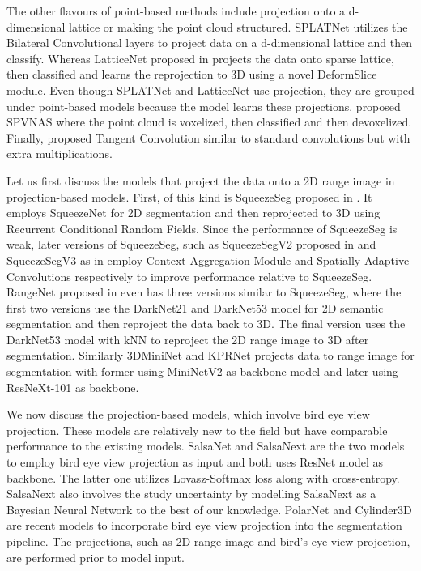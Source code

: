 The other flavours of point-based methods include projection onto a d-dimensional lattice or making the point cloud structured.
SPLATNet \cite{Su_2018_CVPR_splatnet} utilizes the Bilateral Convolutional layers to project data on a d-dimensional lattice and then classify.
Whereas LatticeNet proposed in \cite{rosu2019latticenet} projects the data onto sparse lattice, then classified and learns the reprojection to 3D using a novel DeformSlice module.
Even though SPLATNet and LatticeNet use projection, they are grouped under point-based models because the model learns these projections.
\cite{spvnas} proposed SPVNAS where the point cloud is voxelized, then classified and then devoxelized.
Finally, \cite{Tatarchenko_2018_CVPR_tangconv} proposed Tangent Convolution similar to standard convolutions but with extra multiplications.

Let us first discuss the models that project the data onto a 2D range image in projection-based models.
First, of this kind is SqueezeSeg proposed in \cite{Sequeseseg_2018}. It employs SqueezeNet for 2D segmentation and then reprojected to 3D using Recurrent Conditional Random Fields.
Since the performance of SqueezeSeg is weak, later versions of SqueezeSeg, such as SqueezeSegV2 proposed in \cite{SqueezeSegv2} and SqueezeSegV3 as in \cite{xu2020squeezesegv3} employ Context Aggregation Module and Spatially Adaptive Convolutions respectively to improve performance relative to SqueezeSeg.
RangeNet proposed in \cite{Milioto2019} even has three versions similar to SqueezeSeg, where the first two versions use the DarkNet21 and DarkNet53 model for 2D semantic segmentation and then reproject the data back to 3D.
The final version uses the DarkNet53 model with kNN to reproject the 2D range image to 3D after segmentation.
Similarly 3DMiniNet \cite{3Dmininet} and KPRNet \cite{kochanov2020kprnet} projects data to range image for segmentation with former using MiniNetV2 as backbone model and later using ResNeXt-101 as backbone.

We now discuss the projection-based models, which involve bird eye view projection.
These models are relatively new to the field but have comparable performance to the existing models.
SalsaNet \cite{salsanet2020} and SalsaNext \cite{SalsaNext_2020} are the two models to employ bird eye view projection as input and both uses ResNet model as backbone.
The latter one utilizes Lovasz-Softmax loss along with cross-entropy. SalsaNext also involves the study uncertainty by modelling SalsaNext as a Bayesian Neural Network to the best of our knowledge.
PolarNet \cite{polarnet} and Cylinder3D \cite{zhu2020cylindrical} are recent models to incorporate bird eye view projection into the segmentation pipeline.
The projections, such as 2D range image and bird's eye view projection, are performed prior to model input.

